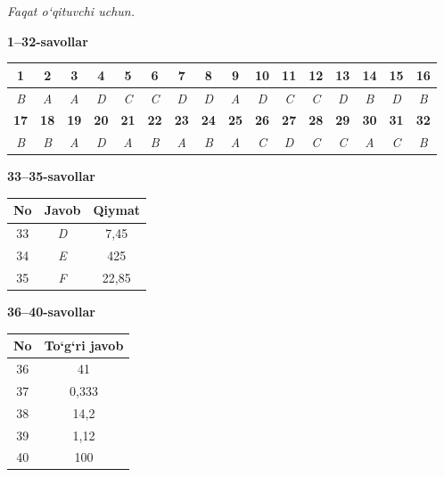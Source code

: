 \documentclass[11pt,a4paper]{article}
\begin{document}
\textit{Faqat o`qituvchi uchun.}\par\medskip
\noindent\textbf{1--32-savollar}\par\smallskip
\noindent\begin{tabular}{|c|c|c|c|c|c|c|c|c|c|c|c|c|c|c|c|}\hline
\textbf{1} & \textbf{2} & \textbf{3} & \textbf{4} & \textbf{5} & \textbf{6} & \textbf{7} & \textbf{8} & \textbf{9} & \textbf{10} & \textbf{11} & \textbf{12} & \textbf{13} & \textbf{14} & \textbf{15} & \textbf{16}\\\hline
\textsl{B} & \textsl{A} & \textsl{A} & \textsl{D} & \textsl{C} & \textsl{C} & \textsl{D} & \textsl{D} & \textsl{A} & \textsl{D} & \textsl{C} & \textsl{C} & \textsl{D} & \textsl{B} & \textsl{D} & \textsl{B}\\\hline
\textbf{17} & \textbf{18} & \textbf{19} & \textbf{20} & \textbf{21} & \textbf{22} & \textbf{23} & \textbf{24} & \textbf{25} & \textbf{26} & \textbf{27} & \textbf{28} & \textbf{29} & \textbf{30} & \textbf{31} & \textbf{32}\\\hline
\textsl{B} & \textsl{B} & \textsl{A} & \textsl{D} & \textsl{A} & \textsl{B} & \textsl{A} & \textsl{B} & \textsl{A} & \textsl{C} & \textsl{D} & \textsl{C} & \textsl{C} & \textsl{A} & \textsl{C} & \textsl{B}\\\hline
\end{tabular}\par\medskip
\noindent\textbf{33--35-savollar}\par\smallskip
\noindent\begin{tabular}{|c|c|c|}\hline \textbf{No} & \textbf{Javob} & \textbf{Qiymat}\\\hline
33 & \textsl{D} & 7,45\\\hline
34 & \textsl{E} & 425\\\hline
35 & \textsl{F} & 22,85\\\hline
\end{tabular}\par\medskip
\noindent\textbf{36--40-savollar}\par\smallskip
\noindent\begin{tabular}{|c|c|}\hline \textbf{No} & \textbf{To`g`ri javob}\\\hline
36 & 41\\\hline
37 & 0,333\\\hline
38 & 14,2\\\hline
39 & 1,12\\\hline
40 & 100\\\hline
\end{tabular}\par\medskip
\end{document}
